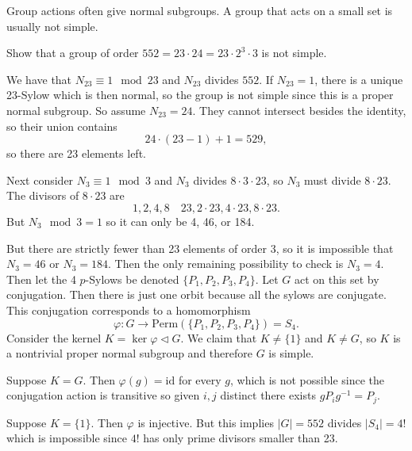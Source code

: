 Group actions often give normal subgroups. A group that acts on a
small set is usually not simple.

\begin{xmpl}
  Show that a group of order
  $552 = 23 \cdot 24 = 23 \cdot 2^3 \cdot 3$ is not simple.
\end{xmpl}
We have that $N_{23} \equiv 1 \mod 23$ and $N_{23}$ divides $552$.
If $N_{23} = 1$, there is a unique 23-Sylow which is then normal,
so the group is not simple since this is a proper normal subgroup.
So assume $N_{23} = 24$. They cannot intersect besides the identity,
so their union contains
$$
24 \cdot (23 - 1) + 1 = 529,
$$
so there are 23 elements left.

Next consider $N_3 \equiv 1 \mod 3$ and $N_3$ divides
$8 \cdot 3 \cdot 23$, so $N_3$ must divide $8 \cdot 23$. The divisors
of $8 \cdot 23$ are
$$
1, 2, 4, 8 \quad 23, 2 \cdot 23, 4 \cdot 23, 8 \cdot 23.
$$
But $N_3 \mod 3 = 1$ so it can only be 4, 46, or 184.

But there are strictly fewer than 23 elements of order 3, so it is impossible
that $N_3 = 46$ or $N_3 = 184$. Then the only remaining possibility to
check is $N_3 = 4$. Then let the 4 $p$-Sylows be denoted
$\{ P_1, P_2, P_3, P_4 \}$. Let $G$ act on this set by
conjugation. Then there is just one orbit because all the sylows are
conjugate. This conjugation corresponds to a homomorphism
$$
\varphi : G \to \mathrm{Perm}(\{P_1, P_2, P_3, P_4\}) = S_4.
$$
Consider the kernel $K = \ker \varphi \triangleleft G$.
We claim that $K \neq \{ 1 \}$ and $K \neq G$, so $K$ is a
nontrivial proper normal subgroup and therefore $G$ is simple.

Suppose $K = G$. Then $\varphi(g) = \mathrm{id}$ for every $g$, which
is not possible since the conjugation action is transitive so
given $i, j$ distinct there exists $g P_i g^{-1} = P_j$.

Suppose $K = \{ 1 \}$. Then $\varphi$ is injective. But this implies
$|G| = 552$ divides $|S_4| = 4!$ which is impossible since $4!$ has
only prime divisors smaller than 23.
